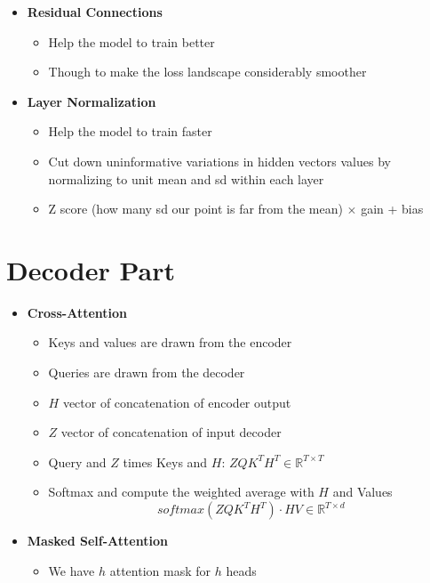 \begin{itemize}
    \begin{itemize}
        \item \textbf{Residual Connections}
        \begin{itemize}
            \item Help the model to train better
            \item Though to make the loss landscape considerably smoother
        \end{itemize}
        \item \textbf{Layer Normalization}
        \begin{itemize}
            \item Help the model to train faster
            \item Cut down uninformative variations in hidden vectors values by normalizing to unit mean and sd within each layer
            \item Z score (how many sd our point is far from the mean) \(\times\) gain + bias
        \end{itemize}
    \end{itemize}
\end{itemize}

\section{Decoder Part}
\begin{itemize}
    \item \textbf{Cross-Attention}
    \begin{itemize}
        \item Keys and values are drawn from the encoder
        \item Queries are drawn from the decoder
        \item \(H\) vector of concatenation of encoder output
        \item \(Z\) vector of concatenation of input decoder
        \item Query and \(Z\) times Keys and \(H\): \(ZQK^TH^T  \in \mathbb{R}^{T \times T}\)
        \item Softmax and compute the weighted average with \(H\) and Values
        \[softmax(ZQK^TH^T) \cdot HV \in \mathbb{R}^{T \times d}\]
    \end{itemize}
    \item \textbf{Masked Self-Attention}
    \begin{itemize}
        \item We have \(h\) attention mask for \(h\) heads
    \end{itemize}
\end{itemize}

